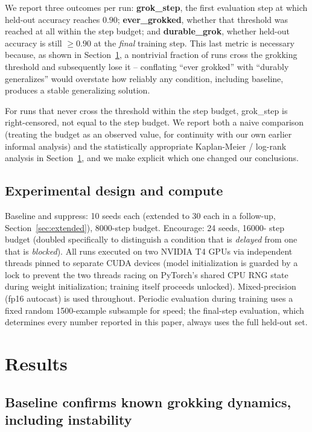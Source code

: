 \documentclass[11pt]{article}
\begin{document}
We report three outcomes per run: \textbf{grok\_step}, the first
evaluation step at which held-out accuracy reaches $0.90$;
\textbf{ever\_grokked}, whether that threshold was reached at all within
the step budget; and \textbf{durable\_grok}, whether held-out accuracy is
still $\geq 0.90$ at the \emph{final} training step. This last metric is
necessary because, as shown in Section~\ref{sec:results}, a nontrivial
fraction of runs cross the grokking threshold and subsequently lose it --
conflating ``ever grokked'' with ``durably generalizes'' would overstate
how reliably any condition, including baseline, produces a stable
generalizing solution.

For runs that never cross the threshold within the step budget, grok\_step
is right-censored, not equal to the step budget. We report both a naive
comparison (treating the budget as an observed value, for continuity with
our own earlier informal analysis) and the statistically appropriate
Kaplan-Meier / log-rank analysis in Section~\ref{sec:results}, and we make
explicit which one changed our conclusions.

\subsection{Experimental design and compute}

Baseline and suppress: 10 seeds each (extended to 30 each in a follow-up,
Section~\ref{sec:extended}), 8000-step budget. Encourage: 24 seeds, 16000-
step budget (doubled specifically to distinguish a condition that is
\emph{delayed} from one that is \emph{blocked}). All runs executed on two
NVIDIA T4 GPUs via independent threads pinned to separate CUDA devices
(model initialization is guarded by a lock to prevent the two threads
racing on PyTorch's shared CPU RNG state during weight initialization;
training itself proceeds unlocked). Mixed-precision (fp16 autocast) is
used throughout. Periodic evaluation during training uses a fixed random
1500-example subsample for speed; the final-step evaluation, which
determines every number reported in this paper, always uses the full
held-out set.

\section{Results}
\label{sec:results}

\subsection{Baseline confirms known grokking dynamics, including instability}
\end{document}
